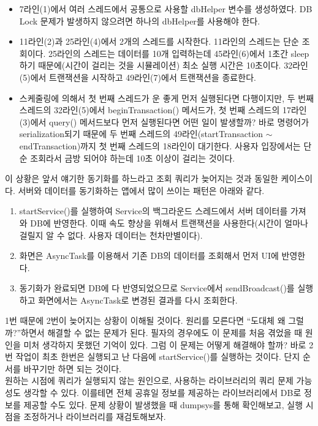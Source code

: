 \begin{itemize}
\item 7라인(1)에서 여러 스레드에서 공통으로 사용할 dbHelper 변수를 생성하였다. DB Lock 문제가 발생하지 않으려면 하나의 dbHelper를 사용해야 한다.

\item 11라인(2)과 25라인(4)에서 2개의 스레드를 시작한다.
11라인의 스레드는 단순 조회이다.
25라인의 스레드는 데이터를 10개 입력하는데 45라인(6)에서 1초간 sleep하기 때문에(시간이 걸리는 것을 시뮬레이션) 최소 실행 시간은 10초이다. 32라인(5)에서 트랜잭션을 시작하고 49라인(7)에서 트랜잭션을 종료한다.

\item 스케줄링에 의해서 첫 번째 스레드가 운 좋게 먼저 실행된다면 다행이지만, 두 번째 스레드의 32라인(5)에서 beginTransaction() 메서드가, 첫 번째 스레드의 17라인(3)에서 query() 메서드보다 먼저 실행된다면 어떤 일이 발생할까? 바로 명령어가 serialization되기 때문에 두 번째 스레드의 49라인(startTransaction $\sim$ endTransaction)까지 첫 번째 스레드의 18라인이 대기한다. 사용자 입장에서는 단순 조회라서 금방 되어야 하는데 10초 이상이 걸리는 것이다. 
\end{itemize}

이 상황은 앞서 얘기한 동기화를 하느라고 조회 쿼리가 늦어지는 것과 동일한 케이스이다. 
서버와 데이터를 동기화하는 앱에서 많이 쓰이는 패턴은 아래와 같다.
\begin{enumerate}
\item startService()를 실행하여 Service의 백그라운드 스레드에서 서버 데이터를 가져와 DB에 반영한다. 이때 속도 향상을 위해서 트랜잭션을 사용한다(시간이 얼마나 걸릴지 알 수 없다. 사용자 데이터는 천차만별이다).
\item 화면은 AsyncTask를 이용해서 기존 DB의 데이터를 조회해서 먼저 UI에 반영한다. 
\item 동기화가 완료되면 DB에 다 반영되었으므로 Service에서 sendBroadcast()를 실행하고 화면에서는 AsyncTask로 변경된 결과를 다시 조회한다.
\end{enumerate}

1번 때문에 2번이 늦어지는 상황이 이해될 것이다. 원리를 모른다면 ``도대체 왜 그럴까?''하면서 해결할 수 없는 문제가 된다. 
필자의 경우에도 이 문제를 처음 겪었을 때 원인을 미처 생각하지 못했던 기억이 있다. 
그럼 이 문제는 어떻게 해결해야 할까? 바로 2번 작업이 최초 한번은 실행되고 난 다음에 startService()를 실행하는 것이다. 
단지 순서를 바꾸기만 하면 되는 것이다.\\

원하는 시점에 쿼리가 실행되지 않는 원인으로, 사용하는 라이브러리의 쿼리 문제 가능성도 생각할 수 있다. 이를테면 전체 공휴일 정보를 제공하는 라이브러리에서 DB로 정보를 제공할 수도 있다.
문제 상황이 발생했을 때 dumpsys를 통해 확인해보고, 실행 시점을 조정하거나 라이브러리를 재검토해보자.

